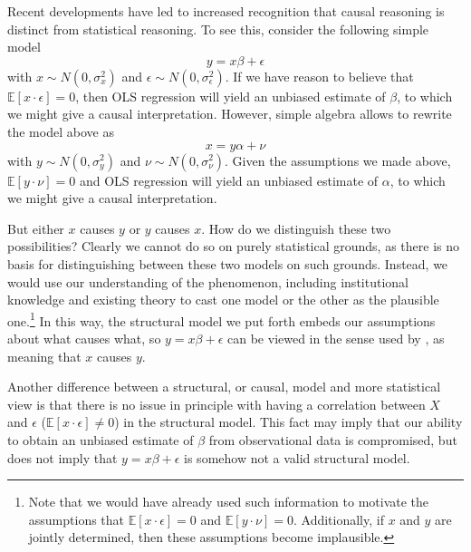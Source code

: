 \documentclass[11pt]{amsart}
\begin{document}
Recent developments have led to increased recognition that causal reasoning is distinct from statistical reasoning.
To see this, consider the following simple model
\[ y = x \beta + \epsilon \]
with $x \sim N(0, \sigma_x^2)$ and $\epsilon  \sim N(0, \sigma_{\epsilon}^2)$.
If we have reason to believe that $\mathbb{E}[x \cdot \epsilon] = 0$, then OLS regression will yield an unbiased estimate of $\beta$, to which we might give a causal interpretation.
However, simple algebra allows to rewrite the model above as 
\[ x = y \alpha + \nu \]
with $y \sim N(0, \sigma_y^2)$ and $\nu  \sim N(0, \sigma_{\nu}^2)$.
Given the assumptions we made above, $\mathbb{E}[y \cdot \nu] = 0$ and OLS regression will yield an unbiased estimate of $\alpha$, to which we might give a causal interpretation.

But either $x$ causes $y$ or $y$ causes $x$. 
How do we distinguish these two possibilities?
Clearly we cannot do so on purely statistical grounds, as there is no basis for distinguishing between these two models on such grounds.
Instead, we would use our understanding of the phenomenon, including institutional knowledge and existing theory to cast one model or the other as the plausible one.\footnote{
Note that we would have already used such information to motivate the assumptions that $\mathbb{E}[x \cdot \epsilon] = 0$ and $\mathbb{E}[y \cdot \nu] = 0$.
Additionally, if $x$ and $y$ are jointly determined, then these assumptions become implausible.}
In this way, the structural model we put forth embeds our assumptions about what causes what, so $y = x \beta + \epsilon$ can be viewed in the sense used by \citep[p.979]{Goldberger:1972cq}, as meaning that $x$ causes $y$.

Another difference between a structural, or causal, model and more statistical view is that there is no issue in principle with having a correlation between $X$ and $\epsilon$ ($\mathbb{E} [x \cdot \epsilon] \neq 0$) in the structural model.
This fact may imply that our ability to obtain an unbiased estimate of $\beta$ from observational data is compromised, but does not imply that $y = x \beta + \epsilon$ is somehow not a valid structural model.
\end{document}
